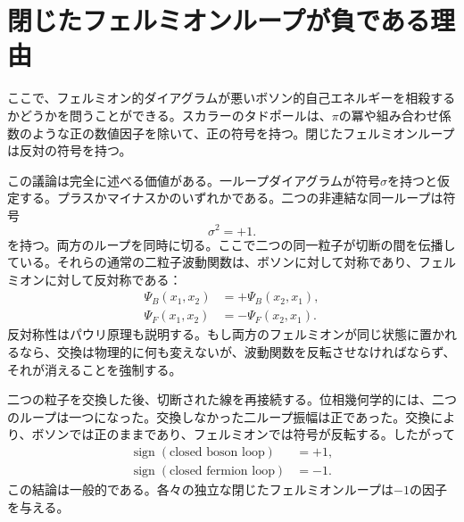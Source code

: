 \section{閉じたフェルミオンループが負である理由}

ここで、フェルミオン的ダイアグラムが悪いボソン的自己エネルギーを相殺するかどうかを問うことができる。スカラーのタドポールは、\(\pi\)の冪や組み合わせ係数のような正の数値因子を除いて、正の符号を持つ。閉じたフェルミオンループは反対の符号を持つ。

\begin{classroomqa}
\end{classroomqa}

この議論は完全に述べる価値がある。一ループダイアグラムが符号\(\sigma\)を持つと仮定する。プラスかマイナスかのいずれかである。二つの非連結な同一ループは符号
\begin{equation}
\sigma^2=+1.
\end{equation}
を持つ。両方のループを同時に切る。ここで二つの同一粒子が切断の間を伝播している。それらの通常の二粒子波動関数は、ボソンに対して対称であり、フェルミオンに対して反対称である：
\begin{align}
\Psi_B(x_1,x_2)&=+\Psi_B(x_2,x_1),\\
\Psi_F(x_1,x_2)&=-\Psi_F(x_2,x_1).
\end{align}
反対称性はパウリ原理も説明する。もし両方のフェルミオンが同じ状態に置かれるなら、交換は物理的に何も変えないが、波動関数を反転させなければならず、それが消えることを強制する。

二つの粒子を交換した後、切断された線を再接続する。位相幾何学的には、二つのループは一つになった。交換しなかった二ループ振幅は正であった。交換により、ボソンでは正のままであり、フェルミオンでは符号が反転する。したがって
\begin{equation}
\begin{aligned}
\operatorname{sign}(\text{closed boson loop})&=+1,\\
\operatorname{sign}(\text{closed fermion loop})&=-1.
\end{aligned}
\end{equation}
この結論は一般的である。各々の独立な閉じたフェルミオンループは\(-1\)の因子を与える。

